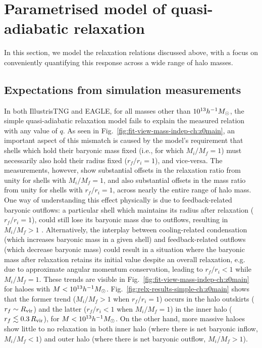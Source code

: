 \section{Parametrised model of quasi-adiabatic relaxation}
\label{sec:results-rad-dep-qadiab-ch:z0main}
In this section, we model the relaxation relations discussed above, with a focus on conveniently quantifying this response across a wide range of halo masses.



\subsection{Expectations from simulation measurements}
\label{subsubsec:sim-relax-ch:z0main}
In both IllustrisTNG and EAGLE, for all masses other than $10^{13} h^{-1}M_{\odot}$, the simple quasi-adiabatic relaxation model  fails to explain the measured relation with any value of $q$. 
As seen in Fig.~\ref{fig:fit-view-mass-indep-ch:z0main}, an important aspect of this mismatch is caused by the model's requirement that shells which hold their baryonic mass fixed (i.e., for which $M_i/M_f=1$) must necessarily also hold their radius fixed ($r_f/r_i=1$), and vice-versa. The measurements, however, show substantial offsets in the relaxation ratio from unity for shells with $M_i/M_f = 1$, and also substantial offsets in the mass ratio from unity for shells with $r_f/r_i=1$, across nearly the entire range of halo mass. One way of understanding this effect physically is due to feedback-related baryonic outflows: a particular shell which maintains its radius after relaxation ($r_f/r_i=1$), could still lose its baryonic mass due to outflows, resulting in $M_i/M_f > 1$ \citep[][]{2022MNRAS.511.3910F}. Alternatively, the interplay between cooling-related condensation (which increases baryonic mass in a given shell) and feedback-related outflows (which decrease baryonic mass) could result in a situation where the baryonic mass after relaxation retains its initial value despite an overall relaxation, e.g. due to approximate angular momentum conservation, leading to $r_f/r_i < 1$ while $M_i/M_f=1$. These trends are visible  in  Fig.~\ref{fig:fit-view-mass-indep-ch:z0main}  for haloes with $M<10^{13}h^{-1}M_{\odot}$. Fig.~\ref{fig:relx-results-simple-ch:z0main} shows that the former trend ($M_i/M_f > 1$ when $r_f/r_i=1$) occurs in the halo outskirts ($r_f\sim R_{\rm vir}$) and the latter ($r_f/r_i < 1$ when $M_i/M_f=1$) in the inner halo ($r_f\lesssim0.3\,R_{\rm vir}$), for $M<10^{13}h^{-1}M_{\odot}$. 
On the other hand, more massive haloes show little to no relaxation in both inner halo (where there is net baryonic inflow, $M_i/M_f < 1$) and outer halo (where there is net baryonic outflow, $M_i/M_f > 1$).

